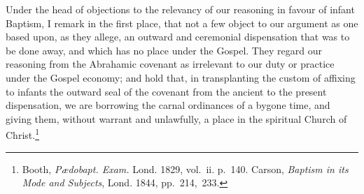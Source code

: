 \documentclass[
  english,
]{book}
\begin{document}
Under the head of objections to the relevancy of our reasoning in favour of infant Baptism, I remark in the first place, that not a few object to our argument as one based upon, as they allege, an outward and ceremonial dispensation that was to be done away, and which has no place under the Gospel. They regard our reasoning from the Abrahamic covenant as irrelevant to our duty or practice under the Gospel economy; and hold that, in transplanting the custom of affixing to infants the outward seal of the covenant from the ancient to the present dispensation, we are borrowing the carnal ordinances of a bygone time, and giving them, without warrant and unlawfully, a place in the spiritual Church of Christ.\footnote{Booth, \emph{Pædobapt. Exam.} Lond. 1829, vol.~ii. p.~140. Carson, \emph{Baptism in its Mode and Subjects}, Lond. 1844, pp.~214,~233.}
\end{document}

